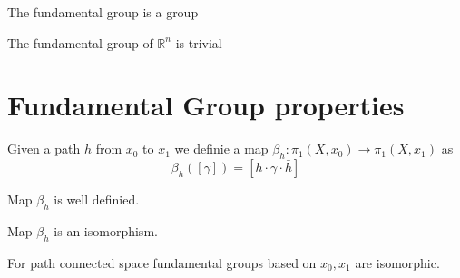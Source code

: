     \begin{theorem} 
        \label{thm:fundamental_group_is_group}

        The fundamental group is a group
    \end{theorem}

    \begin{theorem} 
        \label{thm:Rn_fundamental_group}
        
        The fundamental group of $\mathbb{R}^n$ is trivial
    \end{theorem}

    \section{Fundamental Group properties}

    \begin{definition}
        \label{def:beta_h_map}

        Given a path $h$ from $x_0$ to $x_1$ we definie a map $\beta_h : \pi_1(X,x_0) \to \pi_1(X,x_1)$ as
        $$\beta_h ([\gamma]) = [h \cdot \gamma \cdot \bar{h}]$$
    \end{definition}

    \begin{lemma}
        \label{lem:beta_h_map_welldef}

        Map $\beta_h$ is well definied.
    \end{lemma}

    \begin{lemma}
        \label{lem:beta_h_map_iso}

        Map $\beta_h$ is an isomorphism.
    \end{lemma}

    \begin{lemma}
        \label{fundamental_group_basepoint_dependence}

        For path connected space fundamental groups based on $x_0, x_1$ are isomorphic. 
    \end{lemma}



